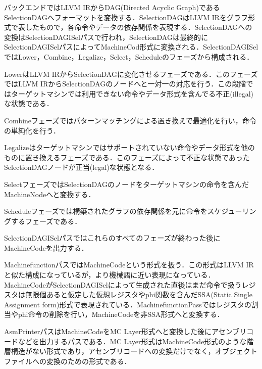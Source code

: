 バックエンドではLLVM IRからDAG(Directed Acyclic Graph)であるSelectionDAGへフォーマットを変換する．SelectionDAGはLLVM IRをグラフ形式で表したもので，各命令やデータの依存関係を表現する．SelectionDAGへの変換はSelectionDAGISelパスで行われ，SelectionDAGは最終的にSelectionDAGISelパスによってMachineCod形式に変換される．SelectionDAGISelではLower，Combine，Legalize，Select，Scheduleのフェーズから構成される．

LowerはLLVM IRからSelectionDAGに変化させるフェーズである．このフェーズではLLVM IRからSelectionDAGのノードへと一対一の対応を行う．この段階ではターゲットマシンでは利用できない命令やデータ形式を含んでる不正(illegal)な状態である．

Combineフェーズではパターンマッチングによる置き換えで最適化を行い，命令の単純化を行う．

Legalizeはターゲットマシンではサポートされていない命令やデータ形式を他のものに置き換えるフェーズである．このフェーズによって不正な状態であったSelectionDAGノードが正当(legal)な状態となる．

SelectフェーズではSelectionDAGのノードをターゲットマシンの命令を含んだMachineNodeへと変換する．

Scheduleフェーズでは構築されたグラフの依存関係を元に命令をスケジューリングするフェーズである．

SelectionDAGISelパスではこれらのすべてのフェーズが終わった後にMachineCodeを出力する．

MachinefunctionパスではMachineCodeという形式を扱う．この形式はLLVM IRと似た構成になっているが，より機械語に近い表現になっている．
MachineCodeがSelectionDAGISelによって生成された直後はまだ命令で扱うレジスタは無限個あると仮定した仮想レジスタやphi関数を含んだSSA(Static Single Assignment form)形式で表現されている．MachinefunctionPassではレジスタの割当やphi命令の削除を行い，MachineCodeを非SSA形式へと変換する．

AsmPrinterパスはMachineCodeをMC Layer形式へと変換した後にアセンブリコードなどを出力するパスである．MC Layer形式はMachineCode形式のような階層構造がない形式であり，アセンブリコードへの変換だけでなく，オブジェクトファイルへの変換のための形式である．

